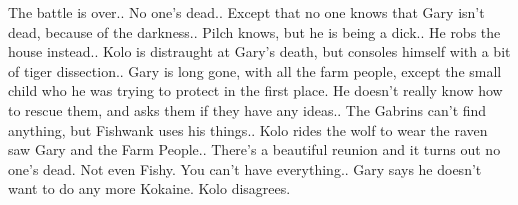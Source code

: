 The battle is over..\medskip
No one’s dead..\medskip
Except that no one knows that Gary isn’t dead, because of the darkness..\medskip
Pilch knows, but he is being a dick..\medskip
He robs the house instead..\medskip
Kolo is distraught at Gary’s death, but consoles himself with a bit of tiger dissection..\medskip
Gary is long gone, with all the farm people, except the small child who he was trying to protect in the first place. He doesn’t really know how to rescue them, and asks them if they have any ideas..\medskip
The Gabrins can’t find anything, but Fishwank uses his things..\medskip
Kolo rides the wolf to wear the raven saw Gary and the Farm People..\medskip
There’s a beautiful reunion and it turns out no one’s dead. Not even Fishy. You can’t have everything..\medskip
Gary says he doesn’t want to do any more Kokaine. Kolo disagrees.